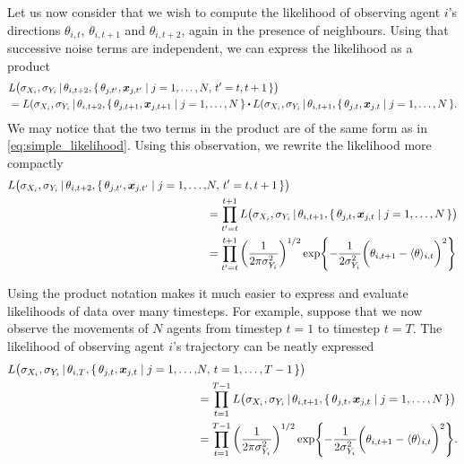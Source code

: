 Let us now consider that we wish to compute the likelihood of observing agent $i$'s directions $\theta_{i, t}$, $\theta_{i, t+1}$ and $\theta_{i, t+2}$, again in the presence of neighbours. Using that successive noise terms are independent, we can express the likelihood as a product
\begin{align*}
	& L\big(\sigma_{X_i}, \sigma_{Y_i}  \given \theta_{i, t+2},  \{\,\theta_{j, t'}, \bm{x}_{j, t'} \mid j=1,\ldots,N, \, t'=t,t+1\,\}\big) \\
									& = L(\sigma_{X_i}, \sigma_{Y_i} \given \theta_{i, t+2}, \{\, \theta_{j, t+1}, \bm{x}_{j, t+1} \mid j=1,\ldots,N\,\} \bigcdot L(\sigma_{X_i}, \sigma_{Y_i} \given \theta_{i, t+1}, \{\, \theta_{j, t}, \bm{x}_{j, t} \mid j=1,\ldots,N\,\}.
\end{align*}
We may notice that the two terms in the product are of the same form as in \cref{eq:simple_likelihood}. Using this observation, we rewrite the likelihood more compactly
\begin{align*}
L\big(\sigma_{X_i}, \sigma_{Y_i}  \,|\, \theta_{i, t+2},  \{\,\theta_{j, t'}, \bm{x}_{j, t'} \mid j=1,\ldots,&N, \, t'=t,t+1\,\}\big) \\
& = \prod_{t'=t}^{t+1} L\big(\sigma_{X_i}, \sigma_{Y_i} \,|\, \theta_{i, t+1},  \{\,\theta_{j, t}, \bm{x}_{j, t} \mid j=1,\ldots,N\,\}\big) \\
& = \prod_{t'=t}^{t+1} \bigg( \frac{1}{2\pi\sigma_{Y_i}^2} \bigg)^{1/2} \exp{-\frac{1}{2\sigma_{Y_i}^2} \bigg(\theta_{i, t+1} - \langle \theta \rangle_{i, t}\bigg)^2 }
\end{align*}

Using the product notation makes it much easier to express and evaluate likelihoods of data over many timesteps. For example, suppose that we now observe the movements of $N$ agents from timestep $t=1$ to timestep $t=T$. The likelihood of observing agent $i$'s trajectory can be neatly expressed
\begin{align*}
	L\big(\sigma_{X_i}, \sigma_{Y_i}  \,|\, \theta_{i, T},  \{\,\theta_{j, t}, \bm{x}_{j, t} \mid j= 1,\ldots,&N, \, t=1,  \ldots,T-1\,\}\big) \\
	& = \prod_{t=1}^{T-1} L\big(\sigma_{X_i}, \sigma_{Y_i} \,|\, \theta_{i, t+1},  \{\,\theta_{j, t}, \bm{x}_{j, t} \mid j=1,\ldots,N\,\}\big) \\
	& = \prod_{t=1}^{T-1} \bigg( \frac{1}{2\pi\sigma_{Y_i}^2} \bigg)^{1/2} \exp{-\frac{1}{2\sigma_{Y_i}^2} \bigg(\theta_{i, t+1} - \langle \theta \rangle_{i, t}\bigg)^2 }.
\end{align*}


